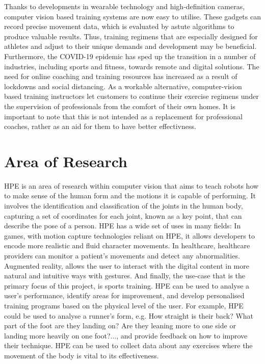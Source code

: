     Thanks to developments in wearable technology and high-definition cameras, computer vision based training systems are now easy to utilise. These gadgets can record precise movement data, which is evaluated by astute algorithms to produce valuable results. Thus, training regimens that are especially designed for athletes and adjust to their unique demands and development may be beneficial.\\
    Furthermore, the COVID-19 epidemic has sped up the transition in a number of industries, including sports and fitness, towards remote and digital solutions. The need for online coaching and training resources has increased as a result of lockdowns and social distancing. As a workable alternative, computer-vision based training instructors let customers to continue their exercise regimens under the supervision of professionals from the comfort of their own homes. It is important to note that this is not intended as a replacement for professional coaches, rather as an aid for them to have better effectivness.

\section{Area of Research}
    HPE is an area of research within computer vision that aims to teach robots how to make sense of the human form and the motions it is capable of performing. It involves the identification and classification of the joints in the human body, capturing a set of coordinates for each joint, known as a key point, that can describe the pose of a person. HPE has a wide set of uses in many fields: In games, with motion capture technologies reliant on HPE, it allows developers to encode more realistic and fluid character movements. In healthcare, healthcare providers can monitor a patient's movements and detect any abnormalities. Augmented reality, allows the user to interact with the digital content in more natural and intuitive ways with gestures. And finally, the use-case that is the primary focus of this project, is sports training. HPE can be used to analyse a user's performance, identify areas for improvement, and develop personalised training programs based on the physical level of the user. For example, HPE could be used to analyse a runner's form, e.g. How straight is their back? What part of the foot are they landing on? Are they leaning more to one side or landing more heavily on one foot?..., and provide feedback on how to improve their technique. HPE can be used to collect data about any exercises where the movement of the body is vital to its effectiveness.
    
